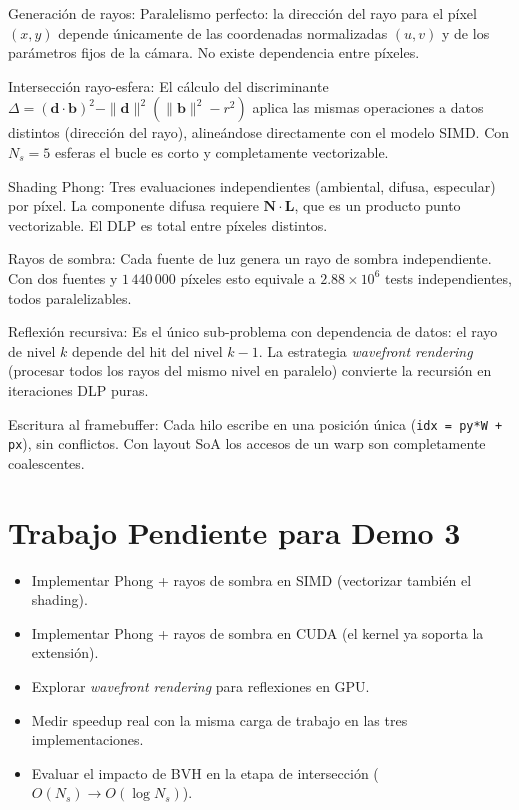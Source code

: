 \documentclass[conference]{IEEEtran}
\begin{document}
\begin{description}
  \item Generación de rayos: Paralelismo perfecto: la dirección del rayo para el píxel
    $(x,y)$ depende únicamente de las coordenadas normalizadas $(u,v)$ y de los
    parámetros fijos de la cámara. No existe dependencia entre píxeles.

  \item Intersección rayo-esfera: El cálculo del discriminante
    $\Delta = (\mathbf{d}\cdot\mathbf{b})^2 - \|\mathbf{d}\|^2(
      \|\mathbf{b}\|^2 - r^2)$
    aplica las mismas operaciones a datos distintos (dirección del rayo), alineándose
    directamente con el modelo SIMD. Con $N_s = 5$ esferas el bucle es corto y
    completamente vectorizable.

  \item Shading Phong: Tres evaluaciones independientes (ambiental, difusa, especular)
    por píxel. La componente difusa requiere $\mathbf{N}\cdot\mathbf{L}$, que es un
    producto punto vectorizable. El DLP es total entre píxeles distintos.

  \item Rayos de sombra: Cada fuente de luz genera un rayo de sombra independiente.
    Con dos fuentes y $1\,440\,000$ píxeles esto equivale a $2.88\!\times\!10^6$ tests
    independientes, todos paralelizables.

  \item Reflexión recursiva: Es el único sub-problema con dependencia de datos: el rayo
    de nivel $k$ depende del hit del nivel $k-1$. La estrategia \textit{wavefront rendering}
    (procesar todos los rayos del mismo nivel en paralelo) convierte la recursión en
    iteraciones DLP puras.

  \item Escritura al framebuffer: Cada hilo escribe en una posición única
    (\texttt{idx = py*W + px}), sin conflictos. Con layout SoA los accesos de un warp
    son completamente coalescentes.
\end{description}

\section{Trabajo Pendiente para Demo 3}

\begin{itemize}
  \item Implementar Phong + rayos de sombra en SIMD (vectorizar también el shading).
  \item Implementar Phong + rayos de sombra en CUDA (el kernel ya soporta la extensión).
  \item Explorar \textit{wavefront rendering} para reflexiones en GPU.
  \item Medir speedup real con la misma carga de trabajo en las tres implementaciones.
  \item Evaluar el impacto de BVH en la etapa de intersección ($O(N_s) \to O(\log N_s)$).
\end{itemize}
\end{document}
